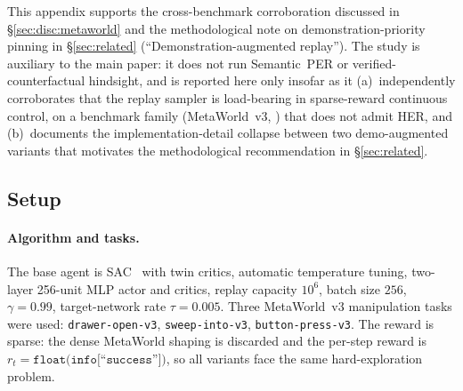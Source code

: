 This appendix supports the cross-benchmark corroboration discussed in
\S\ref{sec:disc:metaworld} and the methodological note on
demonstration-priority pinning in \S\ref{sec:related}
(``Demonstration-augmented replay''). The study is auxiliary to the
main paper: it does not run Semantic~PER or verified-counterfactual
hindsight, and is reported here only insofar as it (a)~independently
corroborates that the replay sampler is load-bearing in
sparse-reward continuous control, on a benchmark family
(MetaWorld~v3, \citep{yu2019metaworld}) that does not admit HER, and
(b)~documents the implementation-detail collapse between two
demo-augmented variants that motivates the methodological
recommendation in \S\ref{sec:related}.

\subsection{Setup}
\label{app:mw:setup}

\paragraph{Algorithm and tasks.}
The base agent is SAC~\citep{haarnoja2018sac} with twin critics,
automatic temperature tuning, two-layer 256-unit MLP actor and
critics, replay capacity $10^6$, batch size $256$, $\gamma=0.99$,
target-network rate $\tau=0.005$. Three MetaWorld~v3 manipulation
tasks were used: \texttt{drawer-open-v3}, \texttt{sweep-into-v3},
\texttt{button-press-v3}. The reward is sparse: the dense MetaWorld
shaping is discarded and the per-step reward is
$r_t = \texttt{float(info[``success''])}$, so all variants face the
same hard-exploration problem.

